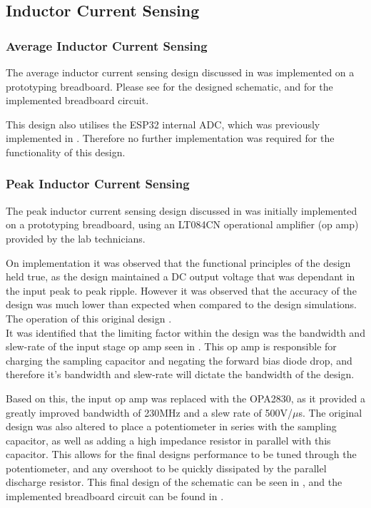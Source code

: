 \subsection{Inductor Current Sensing}

\subsubsection*{Average Inductor Current Sensing}

The average inductor current sensing design discussed in  was implemented on a prototyping breadboard. Please see  for the designed schematic, and  for the implemented breadboard circuit.

This design also utilises the ESP32 internal ADC, which was previously implemented in . Therefore no further implementation was required for the functionality of this design.  


\subsubsection*{Peak Inductor Current Sensing}

The peak inductor current sensing design discussed in  was initially implemented on a prototyping breadboard, using an LT084CN operational amplifier (op amp) provided by the lab technicians. 

On implementation it was observed that the functional principles of the design held true, as the design maintained a DC output voltage that was dependant in the input peak to peak ripple. However it was observed that the accuracy of the design was much lower than expected when compared to the design simulations. The operation of this original design  .\\

It was identified that the limiting factor within the design was the bandwidth and slew-rate of the input stage op amp seen in . This op amp is responsible for charging the sampling capacitor and negating the forward bias diode drop, and therefore it's bandwidth and slew-rate will dictate the bandwidth of the design.  

Based on this, the input op amp was replaced with the OPA2830, as it provided a greatly improved bandwidth of 230MHz and a slew rate of 500V/$\mu$s. The original design was also altered to place a potentiometer in series with the sampling capacitor, as well as adding a high impedance resistor in parallel with this capacitor. This allows for the final designs performance to be tuned through the potentiometer, and any overshoot to be quickly dissipated by the parallel discharge resistor. This final design of the schematic can be seen in , and the implemented breadboard circuit can be found in .

